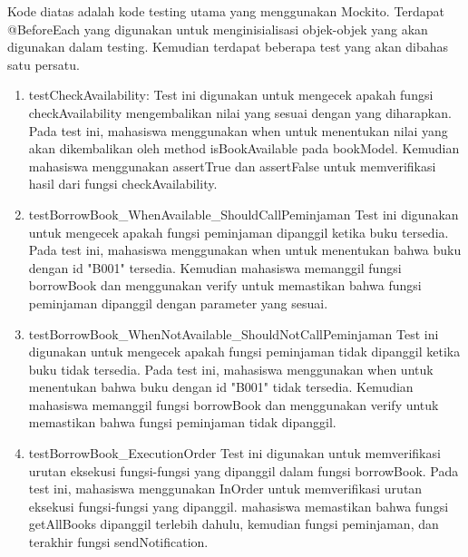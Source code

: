 \documentclass[a4paper,12pt]{article}
\begin{document}
Kode diatas adalah kode testing utama yang menggunakan Mockito. Terdapat @BeforeEach yang digunakan untuk menginisialisasi objek-objek yang akan digunakan dalam testing. Kemudian terdapat beberapa test yang akan dibahas satu persatu.

\begin{enumerate}
    \item testCheckAvailability: Test ini digunakan untuk mengecek apakah fungsi checkAvailability mengembalikan nilai yang sesuai dengan yang diharapkan. Pada test ini, mahasiswa menggunakan when untuk menentukan nilai yang akan dikembalikan oleh method isBookAvailable pada bookModel. Kemudian mahasiswa menggunakan assertTrue dan assertFalse untuk memverifikasi hasil dari fungsi checkAvailability.\label{two}
    \item testBorrowBook\_WhenAvailable\_ShouldCallPeminjaman\: Test ini digunakan untuk mengecek apakah fungsi peminjaman dipanggil ketika buku tersedia. Pada test ini, mahasiswa menggunakan when untuk menentukan bahwa buku dengan id "B001" tersedia. Kemudian mahasiswa memanggil fungsi borrowBook dan menggunakan verify untuk memastikan bahwa fungsi peminjaman dipanggil dengan parameter yang sesuai.\label{three}
    \item testBorrowBook\_WhenNotAvailable\_ShouldNotCallPeminjaman\: Test ini digunakan untuk mengecek apakah fungsi peminjaman tidak dipanggil ketika buku tidak tersedia. Pada test ini, mahasiswa menggunakan when untuk menentukan bahwa buku dengan id "B001" tidak tersedia. Kemudian mahasiswa memanggil fungsi borrowBook dan menggunakan verify untuk memastikan bahwa fungsi peminjaman tidak dipanggil.\label{four}
    \item testBorrowBook\_ExecutionOrder\: Test ini digunakan untuk memverifikasi urutan eksekusi fungsi-fungsi yang dipanggil dalam fungsi borrowBook. Pada test ini, mahasiswa menggunakan InOrder untuk memverifikasi urutan eksekusi fungsi-fungsi yang dipanggil. mahasiswa memastikan bahwa fungsi getAllBooks dipanggil terlebih dahulu, kemudian fungsi peminjaman, dan terakhir fungsi sendNotification.\label{six}
\end{enumerate}
\end{document}
